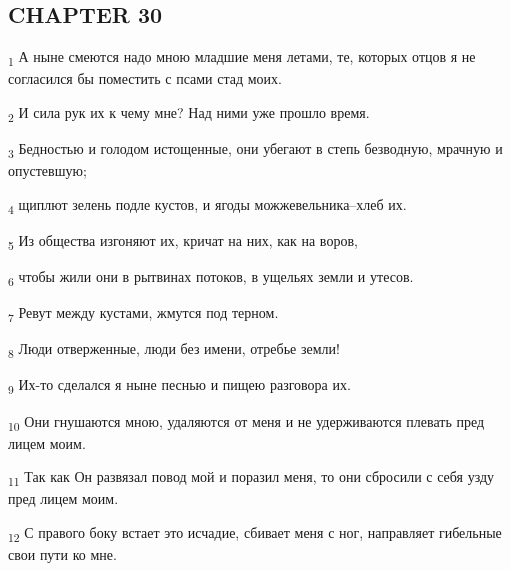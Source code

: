 \subsection{CHAPTER 30}
\begin{tcolorbox}
\textsubscript{1} А ныне смеются надо мною младшие меня летами, те, которых отцов я не согласился бы поместить с псами стад моих.
\end{tcolorbox}
\begin{tcolorbox}
\textsubscript{2} И сила рук их к чему мне? Над ними уже прошло время.
\end{tcolorbox}
\begin{tcolorbox}
\textsubscript{3} Бедностью и голодом истощенные, они убегают в степь безводную, мрачную и опустевшую;
\end{tcolorbox}
\begin{tcolorbox}
\textsubscript{4} щиплют зелень подле кустов, и ягоды можжевельника--хлеб их.
\end{tcolorbox}
\begin{tcolorbox}
\textsubscript{5} Из общества изгоняют их, кричат на них, как на воров,
\end{tcolorbox}
\begin{tcolorbox}
\textsubscript{6} чтобы жили они в рытвинах потоков, в ущельях земли и утесов.
\end{tcolorbox}
\begin{tcolorbox}
\textsubscript{7} Ревут между кустами, жмутся под терном.
\end{tcolorbox}
\begin{tcolorbox}
\textsubscript{8} Люди отверженные, люди без имени, отребье земли!
\end{tcolorbox}
\begin{tcolorbox}
\textsubscript{9} Их-то сделался я ныне песнью и пищею разговора их.
\end{tcolorbox}
\begin{tcolorbox}
\textsubscript{10} Они гнушаются мною, удаляются от меня и не удерживаются плевать пред лицем моим.
\end{tcolorbox}
\begin{tcolorbox}
\textsubscript{11} Так как Он развязал повод мой и поразил меня, то они сбросили с себя узду пред лицем моим.
\end{tcolorbox}
\begin{tcolorbox}
\textsubscript{12} С правого боку встает это исчадие, сбивает меня с ног, направляет гибельные свои пути ко мне.
\end{tcolorbox}
